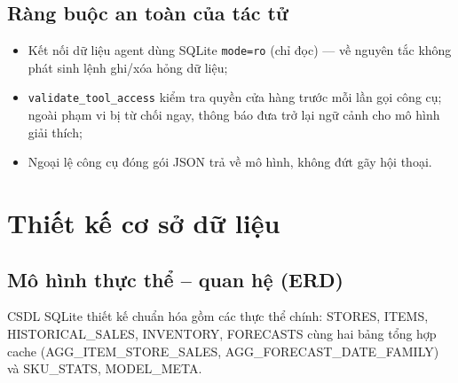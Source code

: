 \documentclass[12pt,a4paper]{report}
\begin{document}
\subsection{Ràng buộc an toàn của tác tử}

\begin{itemize}
    \item Kết nối dữ liệu agent dùng SQLite \texttt{mode=ro} (chỉ đọc) --- về nguyên tắc không phát sinh lệnh ghi/xóa hỏng dữ liệu;
    \item \texttt{validate\_tool\_access} kiểm tra quyền cửa hàng trước mỗi lần gọi công cụ; ngoài phạm vi bị từ chối ngay, thông báo đưa trở lại ngữ cảnh cho mô hình giải thích;
    \item Ngoại lệ công cụ đóng gói JSON trả về mô hình, không đứt gãy hội thoại.
\end{itemize}

\section{Thiết kế cơ sở dữ liệu}

\subsection{Mô hình thực thể -- quan hệ (ERD)}

CSDL SQLite thiết kế chuẩn hóa gồm các thực thể chính: STORES, ITEMS, HISTORICAL\_SALES, INVENTORY, FORECASTS cùng hai bảng tổng hợp cache (AGG\_ITEM\_STORE\_SALES, AGG\_FORECAST\_DATE\_FAMILY) và SKU\_STATS, MODEL\_META.

\end{document}
